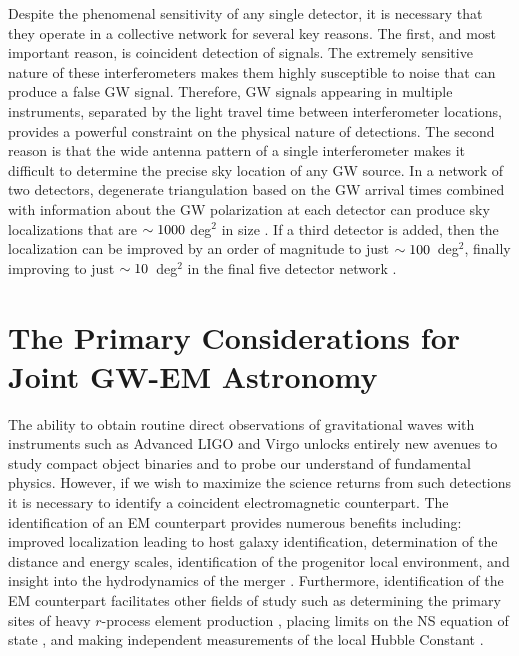 Despite the phenomenal sensitivity of any single detector, it is necessary that they operate in a collective network for several key reasons. The first, and most important reason, is coincident detection of signals. The extremely sensitive nature of these interferometers makes them highly susceptible to noise that can produce a false GW signal. Therefore, GW signals appearing in multiple instruments, separated by the light travel time between interferometer locations, provides a powerful constraint on the physical nature of detections. The second reason is that the wide antenna pattern of a single interferometer makes it difficult to determine the precise sky location of any GW source. In a network of two detectors, degenerate triangulation based on the GW arrival times combined with information about the GW polarization at each detector can produce sky localizations that are $\sim1000$ deg$^2$ in size \citep[see e.g.,][]{LIGOLocalization,ChenHolz16}. If a third detector is added, then the localization can be improved by an order of magnitude to just $\sim100$~deg$^2$, finally improving to just $\sim10$~deg$^2$ in the final five detector network \citep[see e.g.,][]{LIGOLocalization,ChenHolz16}.

\section{The Primary Considerations for Joint GW-EM Astronomy}
\label{sec:intro_joint}
The ability to obtain routine direct observations of gravitational waves with instruments such as Advanced LIGO and Virgo unlocks entirely new avenues to study compact object binaries and to probe our understand of fundamental physics. However, if we wish to maximize the science returns from such detections it is necessary to identify a coincident electromagnetic counterpart. The identification of an EM counterpart provides numerous benefits including: improved localization leading to host galaxy identification, determination of the distance and energy scales, identification of the progenitor local environment, and insight into the hydrodynamics of the merger \citep[see e.g.,][]{Sylvestre2003,Stubbs2008,Phinney2010,Stamatikos+09, Fong+10,MetzgerBerger12,Fong+13,FongBerger13,Fong+15}. Furthermore, identification of the EM counterpart facilitates other fields of study such as determining the primary sites of heavy $r$-process element production \citep{Rosswog+14,vandeVoort+15,Kasen+17}, placing limits on the NS equation of state \citep[see e.g.,][]{Hotokezaka+11,Kawaguchi+15,Radice+18}, and making independent measurements of the local Hubble Constant \citep[H$_0$, see e.g.,][]{Schutz1986,HolzHughes05,DelPozzo2012, LIGOH0,Guidorzi+17}.

